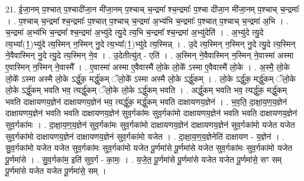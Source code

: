 \documentclass[17pt]{extarticle}
\begin{document}
21. ई॒जा॒नम् प॒श्चात् प॒श्चादी॑जा॒न मी॑जा॒नम् प॒श्चाच् च॒न्द्रमा᳚ श्च॒न्द्रमाः᳚ प॒श्चा दी॑जा॒न मी॑जा॒नम् प॒श्चाच् च॒न्द्रमाः᳚ । . प॒श्चाच् च॒न्द्रमा᳚ श्च॒न्द्रमाः᳚ प॒श्चात् प॒श्चाच् च॒न्द्रमा॑ अ॒भ्य॑भि च॒न्द्रमाः᳚ प॒श्चात् प॒श्चाच् च॒न्द्रमा॑ अ॒भि । . च॒न्द्रमा॑ अ॒भ्य॑भि च॒न्द्रमा᳚ श्च॒न्द्रमा॑ अ॒भ्यु॑दे त्यु॒दे त्य॒भि च॒न्द्रमा᳚ श्च॒न्द्रमा॑ अ॒भ्यु॑देति॑ । . अ॒भ्यु॑दे त्यु॒दे त्य॒भ्या᳚(1॒)भ्यु॑दे त्य॒स्मिन् न॒स्मिन् नु॒दे त्य॒भ्या᳚(1॒)भ्यु॑दे त्य॒स्मिन्न् । . उ॒दे त्य॒स्मिन् न॒स्मिन् नु॒दे त्यु॒दे त्य॒स्मिन् ने॒वैवास्मिन् नु॒दे त्यु॒दे त्य॒स्मिन् ने॒व । . उ॒देतीत्यु॑त् - एति॑ । . अ॒स्मिन् ने॒वैवास्मिन् न॒स्मिन् ने॒वास्मा॑ अस्मा ए॒वास्मिन् न॒स्मिन् ने॒वास्मै᳚ । . ए॒वास्मा॑ अस्मा ए॒वैवास्मै॑ लो॒के लो॒के᳚ ऽस्मा ए॒वैवास्मै॑ लो॒के । . अ॒स्मै॒ लो॒के लो॒के᳚ ऽस्मा अस्मै लो॒के ऽर्द्धु॑क॒ मर्द्धु॑कम् ॅलो॒के᳚ ऽस्मा अस्मै लो॒के ऽर्द्धु॑कम् । . लो॒के ऽर्द्धु॑क॒ मर्द्धु॑कम् ॅलो॒के लो॒के ऽर्द्धु॑कम् भवति भव॒ त्यर्द्धु॑कम् ॅलो॒के लो॒के ऽर्द्धु॑कम् भवति । . अर्द्धु॑कम् भवति भव॒ त्यर्द्धु॑क॒ मर्द्धु॑कम् भवति दाक्षायणय॒ज्ञेन॑ दाक्षायणय॒ज्ञेन॑ भव॒ त्यर्द्धु॑क॒ मर्द्धु॑कम् भवति दाक्षायणय॒ज्ञेन॑ । . भ॒व॒ति॒ दा॒क्षा॒य॒ण॒य॒ज्ञेन॑ दाक्षायणय॒ज्ञेन॑ भवति भवति दाक्षायणय॒ज्ञेन॑ सुव॒र्गका॑मः सुव॒र्गका॑मो दाक्षायणय॒ज्ञेन॑ भवति भवति दाक्षायणय॒ज्ञेन॑ सुव॒र्गका॑मः । . दा॒क्षा॒य॒ण॒य॒ज्ञेन॑ सुव॒र्गका॑मः सुव॒र्गका॑मो दाक्षायणय॒ज्ञेन॑ दाक्षायणय॒ज्ञेन॑ सुव॒र्गका॑मो यजेत यजेत सुव॒र्गका॑मो दाक्षायणय॒ज्ञेन॑ दाक्षायणय॒ज्ञेन॑ सुव॒र्गका॑मो यजेत । . दा॒क्षा॒य॒ण॒य॒ज्ञेनेति॑ दाक्षायण - य॒ज्ञेन॑ । . सु॒व॒र्गका॑मो यजेत यजेत सुव॒र्गका॑मः सुव॒र्गका॑मो यजेत पू॒र्णमा॑से पू॒र्णमा॑से यजेत सुव॒र्गका॑मः सुव॒र्गका॑मो यजेत पू॒र्णमा॑से । . सु॒व॒र्गका॑म॒ इति॑ सुव॒र्ग - का॒मः॒ । . य॒जे॒त॒ पू॒र्णमा॑से पू॒र्णमा॑से यजेत यजेत पू॒र्णमा॑से॒ सꣳ सम् पू॒र्णमा॑से यजेत यजेत पू॒र्णमा॑से॒ सम् । \newline
\end{document}
